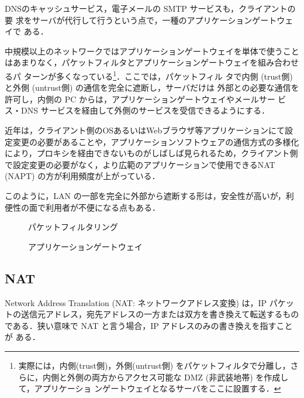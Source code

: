 DNSのキャッシュサービス，電子メールの SMTP サービスも，クライアントの要
求をサーバが代行して行うという点で，一種のアプリケーションゲートウェイで
ある．

中規模以上のネットワークではアプリケーションゲートウェイを単体で使うことはあまりなく，パケットフィルタとアプリケーションゲートウェイを組み合わせるパ
ターンが多くなっている\footnote{実際には，内側(trust側)，外側(untrust側)
をパケットフィルタで分離し，さらに，内側と外側の両方からアクセス可能な
DMZ (非武装地帯) を作成して，アプリケーショ
ンゲートウェイとなるサーバをここに設置する．}．ここでは，パケットフィル
タで内側 (trust側) と外側 (untrust側) の通信を完全に遮断し，サーバだけは
外部との必要な通信を許可し，内側の PC からは，アプリケーションゲートウェイやメールサー
ビス・DNS サービスを経由して外側のサービスを受信できるようにする．

近年は，クライアント側のOSあるいはWebブラウザ等アプリケーションにて設定変更の必要があることや，アプリケーションソフトウェアの通信方式の多様化により，プロキシを経由できないものがしばしば見られるため，クライアント側で設定変更の必要がなく，より広範のアプリケーションで使用できるNAT (NAPT) の方が利用頻度が上がっている．

このように，LAN の一部を完全に外部から遮断する形は，安全性が高いが，利便性の面で利用者が不便になる点もある．

\begin{figure}[h]
 \begin{center}
  \caption{パケットフィルタリング}
  \label{fig:06:pf}
 \end{center}
\end{figure}

\begin{figure}[h]
  \begin{center}
  \caption{アプリケーションゲートウェイ}
  \label{fig:06:ag}
 \end{center}
\end{figure}

\subsection{NAT}

Network Address Translation (NAT: ネットワークアドレス変換) は，IP パケッ
トの送信元アドレス，宛先アドレスの一方または双方を書き換えて転送するもの
である．狭い意味で NAT と言う場合，IP アドレスのみの書き換えを指すことが
ある．

